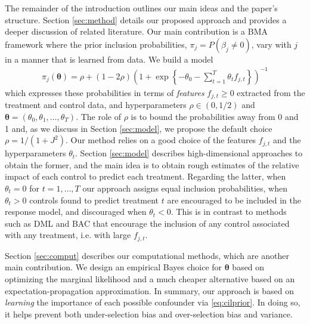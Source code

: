 \documentclass[12pt]{article}
\newcommand{\btheta}{{\bm{\theta}}}
\begin{document}
The remainder of the introduction outlines our main ideas and the paper's structure.
Section \ref{sec:method} details our proposed approach and provides a deeper discussion of related literature. Our main contribution is a BMA framework where the prior inclusion probabilities, $\pi_j = P(\beta_j \neq 0)$, vary with $j$ in a manner that is learned from data. We build a model 
\begin{align}
\pi_{j}(\btheta) = \rho  + (1 - 2 \rho) \left( 1 + \exp \left\{ - \theta_{0} - \sum_{t=1}^{T} \theta_{t} f_{j,t} \right\} \right)^{-1} \label{eq:cilprior}
\end{align}
which expresses these probabilities in terms of \emph{features} $f_{j,t} \geq 0$ extracted from the treatment and control data, and hyperparameters $\rho \in (0, 1/2)$ and  $\btheta = (\theta_{0}, \theta_{1}, \dots, \theta_{T})$. The role of $\rho$ is to bound the probabilities away from 0 and 1 and, as we discuss in Section \ref{sec:model},  we propose the default choice $\rho = 1/(1+J^2)$. Our method relies on a good choice of the features $f_{j,t}$ %
and the hyperparameters $\theta_t$. %
Section \ref{sec:model} describes high-dimensional approaches to obtain the former, and the main idea is to obtain rough estimates of the relative impact of each control to predict each treatment. Regarding the latter, when $\theta_t=0$ for $t=1,\ldots,T$ our approach assigns equal inclusion probabilities, when $\theta_t>0$ controls found to predict treatment $t$ are encouraged to be included in the response model, and discouraged when  $\theta_t<0$. 
This is in contrast to methods such as DML and BAC that encourage the inclusion of any control associated with any treatment, i.e. with large $f_{j,t}$.  

Section \ref{sec:comput} describes our computational methods, which are another main contribution. \color{black}
We design an empirical Bayes choice for $\btheta$ based on optimizing the marginal likelihood %
and a much cheaper alternative based on an expectation-propagation approximation. %
In summary, our approach is based on \emph{learning} the importance of each possible confounder via \eqref{eq:cilprior}. %
In doing so, it helps prevent both under-selection bias and over-selection bias and variance.
\end{document}
